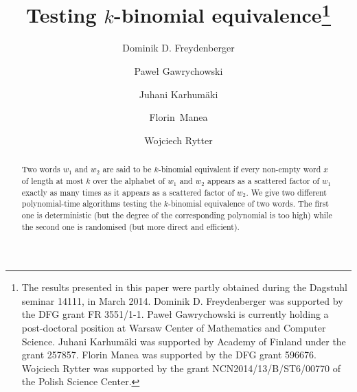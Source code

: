 \documentclass[runningheads]{llncs}
\begin{document}
\title{Testing $k$-binomial equivalence\thanks{The results presented in this paper were partly obtained during the Dagstuhl seminar 14111, in March 2014. Dominik D. Freydenberger was supported by the DFG grant FR 3551/1-1. Pawe{\l} Gawrychowski is currently holding a post-doctoral position at Warsaw Center of Mathematics and Computer Science. Juhani Karhum\"aki was supported by Academy of Finland under the grant 257857. Florin Manea was supported by the DFG grant 596676. Wojciech Rytter was supported by the grant NCN2014/13/B/ST6/00770 of the Polish Science Center. }
}

\author{Dominik D. Freydenberger \and Pawe{\l} Gawrychowski \and Juhani Karhum\"aki \and \mbox{Florin Manea} \and Wojciech Rytter}


\maketitle

\begin{abstract}
Two words $w_1$ and $w_2$ are said to be $k$-binomial equivalent if every non-empty word $x$ of length at most $k$ over the alphabet of $w_1$ and $w_2$ appears as a scattered factor of $w_1$ exactly as many times as it appears as a scattered factor of $w_2$. We give two different polynomial-time algorithms testing the $k$-binomial equivalence of two words. The first one is deterministic (but the degree of the
corresponding polynomial is too high) while the second one is randomised (but more direct and efficient). \end{abstract}
\end{document}
